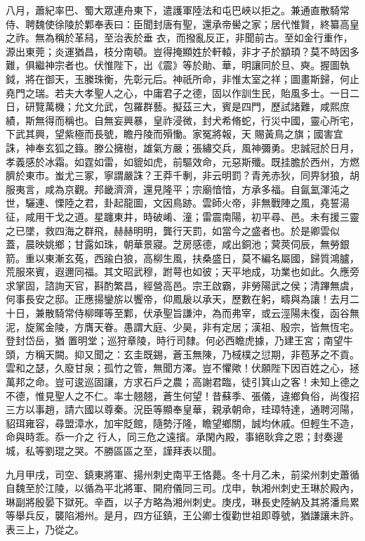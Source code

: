 \begin{pinyinscope}
 八月，蕭紀率巴、蜀大眾連舟東下，遣護軍陸法和屯巴峽以拒之。兼通直散騎常侍、聘魏使徐陵於鄴奉表曰：臣聞封唐有聖，還承帝嚳之家；居代惟賢，終纂高皇之祚。無為稱於革舄，至治表於垂
 衣，而撥亂反正，非聞前古。至如金行重作，源出東莞；炎運猶昌，枝分南頓。豈得掩顯姓於軒轅，非才子於顓頊？莫不時因多難，俱繼神宗者也。伏惟陛下，出《震》等於勛、華，明讓同於旦、奭。握圖執鉞，將在御天，玉縢珠衡，先彰元后。神祇所命，非惟太室之祥；圖畫斯歸，何止堯門之瑞。若夫大孝聖人之心，中庸君子之德，固以作訓生民，貽風多士。一日二日，研覽萬機；允文允武，包羅群藝。擬茲三大，賓是四門，歷試諸難，咸熙庶績，斯無得而稱也。自無妄興暴，皇祚浸微，封犬希脩蛇，行災中國，靈心所宅，下武其興，望紫極而長號，瞻丹陵而殞慟。家冤將報，天
 賜黃鳥之旗；國害宜誅，神奉玄狐之籙。滕公擁樹，雄氣方嚴；張繡交兵，風神彌勇。忠誠冠於日月，孝義感於冰霜。如霆如雷，如貔如虎，前驅效命，元惡斯殲。既挂膽於西州，方燃臍於東市。蚩尤三冢，寧謂嚴誅？王莽千剸，非云明罰？青羌赤狄，同畀豺狼，胡服夷言，咸為京觀。邦畿濟濟，還見隆平；宗廟愔愔，方承多福。自氤氳渾沌之世，驪連、慄陸之君，卦起龍圖，文因鳥跡。雲師火帝，非無戰陣之風，堯誓湯征，咸用干戈之道。星躔東井，時破崤、潼；雷震南陽，初平尋、邑。未有援三靈之已墜，救四海之群飛，赫赫明明，龔行天罰，如當今之盛者也。於是卿雲似
 蓋，晨映姚鄉；甘露如珠，朝華景寢。芝房感德，咸出銅池；蓂莢伺辰，無勞銀箭。重以東漸玄菟，西踰白狼，高柳生風，扶桑盛日，莫不編名屬國，歸質鴻臚，荒服來賓，遐邇同福。其文昭武穆，跗萼也如彼；天平地成，功業也如此。久應旁求掌固，諮詢天官，斟酌繁昌，經營高邑。宗王啟霸，非勞陽武之侯；清蹕無虞，何事長安之邸。正應揚鑾旂以饗帝，仰鳳扆以承天，歷數在躬，疇與為讓！去月二十日，兼散騎常侍柳暉等至鄴，伏承聖旨謙沖，為而弗宰，或云涇陽未復，函谷無泥，旋駕金陵，方膺天眷。愚謂大庭、少昊，非有定居；漢祖、殷宗，皆無恆宅。登封岱岳，猶
 置明堂；巡狩章陵，時行司隸。何必西瞻虎據，乃建王宮；南望牛頭，方稱天闕。抑又聞之：玄圭既錫，蒼玉無陳，乃棫樸之愆期，非苞茅之不貢。雲和之瑟，久廢甘泉；孤竹之管，無聞方澤。豈不懼歟！伏願陛下因百姓之心，拯萬邦之命。豈可逡巡固讓，方求石戶之農；高謝君臨，徒引箕山之客！未知上德之不德，惟見聖人之不仁。率士翹翹，蒼生何望！昔蘇季、張儀，違鄉負俗，尚復招三方以事趙，請六國以尊秦。況臣等顯奉皇華，親承朝命，珪璋特達，通聘河陽，貂珥雍容，尋盟漳水，加牢貶館，隨勢汙隆，瞻望鄉關，誠均休戚。但輕生不造，命與時乖。忝一介之
 行人，同三危之遠擯。承閑內殿，事絕耿弇之恩；封奏邊城，私等劉琨之哭。不勝區區之至，謹拜表以聞。



 九月甲戌，司空、鎮東將軍、揚州刺史南平王恪薨。冬十月乙未，前梁州刺史蕭循自魏至於江陵，以循為平北將軍、開府儀同三司。戊申，執湘州刺史王琳於殿內，琳副將殷晏下獄死。辛酉，以子方略為湘州刺史。庚戌，琳長史陸納及其將潘烏累等舉兵反，襲陷湘州。是月，四方征鎮，王公卿士復勸世祖即尊號，猶謙讓未許。表三上，乃從之。




\end{pinyinscope}

